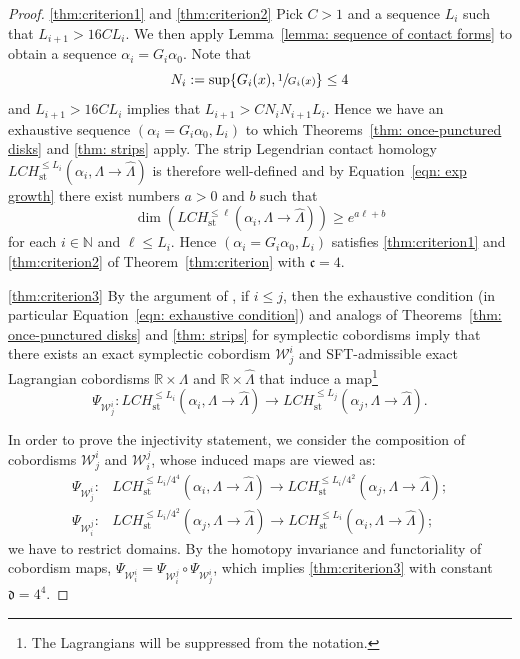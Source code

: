\documentclass[10pt]{amsart}
\let\mathcal\mathscr
\let\ra\rightarrow
\newcommand{\st}{\mathrm{st}}
\theoremstyle{plain}
\theoremstyle{definition}
\numberwithin{equation}{subsection}
\newcommand{\RR}{\mathbb{R}}
\providecommand{\skpt}{\par\smallskip\noindent}
\begin{document}
\skpt
\begin{proof}
\eqref{thm:criterion1} and \eqref{thm:criterion2} Pick $C>1$ and a sequence $L_i$ such that $L_{i+1}> 16 C L_i$. We then apply Lemma~\ref{lemma: sequence of contact forms} to obtain a sequence $\alpha_i=G_i\alpha_0$. Note that $$N_i:=\sup\{G_i(x),\sfrac{1}{G_i(x)}\}\leq 4$$ and $L_{i+1}> 16 C L_i$ implies that $L_{i+1}> C N_i N_{i+1} L_i$. Hence we have an exhaustive sequence $(\alpha_i=G_i\alpha_0, L_i)$ to which Theorems~\ref{thm: once-punctured disks} and \ref{thm: strips} apply. The strip Legendrian contact homology $LCH^{\leq L_i}_{\st}(\alpha_i, \Lambda\ra \widehat{\Lambda})$ is therefore well-defined and by Equation~\eqref{eqn: exp growth} there exist numbers $a>0$ and $b$ such that
\begin{equation}%
\dim(LCH^{\leq \ell}_{\st}(\alpha_i,\Lambda\ra \widehat{\Lambda})) \geq e^{a \ell+b}
\end{equation}
for each $i\in \mathbb{N}$ and $\ell\leq L_i$. Hence $(\alpha_i=G_i\alpha_0,L_i)$ satisfies \eqref{thm:criterion1} and \eqref{thm:criterion2} of Theorem~\ref{thm:criterion} with ${\mathfrak c}=4$.

\eqref{thm:criterion3} By the argument of \cite[\S 10.3]{CH2}, if $i\leq j$, then the exhaustive condition (in particular Equation~\eqref{eqn: exhaustive condition}) and analogs of Theorems~\ref{thm: once-punctured disks} and \ref{thm: strips} for symplectic cobordisms imply that there exists an exact symplectic cobordism $\mathcal{W}^i_j$ and SFT-admissible exact Lagrangian cobordisms $\RR\times\Lambda$ and $\RR\times\widehat\Lambda$ that induce a map\footnote{The Lagrangians will be suppressed from the notation.}
\begin{equation}
\Psi_{\mathcal{W}^i_j}: LCH^{\leq L_i }_{\st}(\alpha_i,\Lambda\ra \widehat{\Lambda}) \to LCH^{\leq L_j}_{\st}(\alpha_j,\Lambda\ra \widehat{\Lambda}).
\end{equation}

In order to prove the injectivity statement, we consider the composition of cobordisms $\mathcal{W}^i_j$ and $\mathcal{W}^j_i$, whose induced maps are viewed as:
\begin{align}
\Psi_{\mathcal{W}^i_j}: & LCH^{\leq L_i/4^4 }_{\st}(\alpha_i,\Lambda\ra \widehat{\Lambda}) \to LCH^{\leq L_i/4^2}_{\st}(\alpha_j,\Lambda\ra \widehat{\Lambda});\\
\Psi_{\mathcal{W}^j_i}: & LCH^{\leq L_i/4^2}_{\st}(\alpha_j,\Lambda\ra \widehat{\Lambda}) \to LCH^{\leq L_i}_{\st}(\alpha_i,\Lambda\ra \widehat{\Lambda});
\end{align}
\ie we have to restrict domains.
By the homotopy invariance and functoriality of cobordism maps, $ \Psi_{\mathcal{W}^i_i}= \Psi_{\mathcal{W}^j_i } \circ \Psi_{\mathcal{W}^i_j}$, which implies \eqref{thm:criterion3} with constant ${\mathfrak d}=4^4$.
\end{proof}
\end{document}
